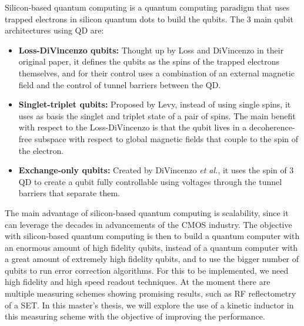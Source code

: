 \documentclass[../main.tex]{subfiles}
\begin{document}
Silicon-based quantum computing is a quantum computing paradigm that uses
trapped electrons in silicon quantum dots to build the qubits. The 3 main
qubit architectures using QD are\cite{burkardSemiconductorSpinQubits2023}:

\begin{itemize}
    \item \textbf{Loss-DiVincenzo qubits:} Thought up by Loss and DiVincenzo\cite{lossQuantumComputationQuantum1998}
        in their original paper, it defines the qubits as the spins of the
        trapped electrons themselves, and for their control uses a combination
        of an external magnetic field and the control of tunnel barriers
        between the QD.
    \item \textbf{Singlet-triplet qubits:} Proposed by Levy\cite{levyUniversalQuantumComputation2002}, instead
        of using single spins, it uses as basis the singlet and triplet state
        of a pair of spins. The main benefit with respect to the Loss-DiVincenzo
        is that the qubit lives in a decoherence-free subspace with respect
        to global magnetic fields that couple to the spin of the electron.
    \item \textbf{Exchange-only qubits:} Created by DiVincenzo \textit{et al.}\cite{divincenzoUniversalQuantumComputation2000},
        it uses
        the spin of 3 QD to create a qubit fully controllable using voltages
        through the tunnel barriers that separate them.
\end{itemize}

The main advantage of silicon-based quantum computing is scalability, since
it can leverage the decades in advancements of the CMOS industry. The objective
with silicon-based quantum computing is then to build a quantum computer with
an enormous amount of high fidelity qubits, instead of a quantum computer
with a great amount of extremely high fidelity qubits, and to use the bigger
number of qubits to run error correction algorithms. For this to be implemented,
we need high fidelity and high speed readout techniques. At the moment there are
multiple measuring schemes showing promising results\cite{gonzalez-zalbaScalingSiliconbasedQuantum2021}, such as RF reflectometry
of a SET. In this master's thesis, we will explore the use of a kinetic inductor
in this measuring scheme with the objective of improving the performance.
\end{document}
